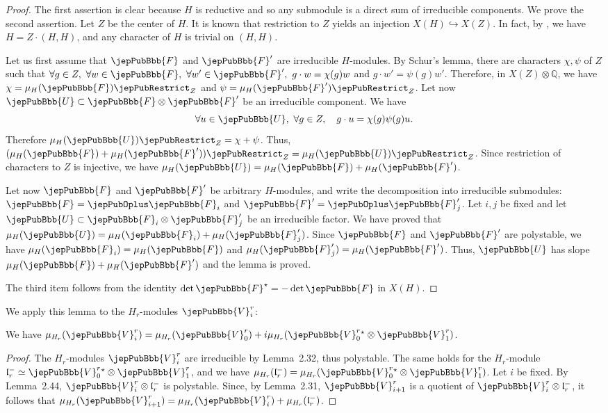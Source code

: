\begin{proof}
The first assertion is clear because $H$ is reductive and so any submodule is a direct sum of irreducible components. We prove the second assertion. Let $Z$ be the center of $H$. It is known that restriction to $Z$ yields an injection $X(H)\hookrightarrow X(Z)$. In fact, by \cite[Prop.~14.2]{jep93Bor69}, we have $H=Z\cdot(H,H)$, and any character of $H$ is trivial on $(H,H)$.

Let us first assume that $\jepPubBbb{F}$ and $\jepPubBbb{F}'$ are irreducible $H$-modules. By Schur's lemma, there are characters $\chi,\psi$ of $Z$ such that $\forall g\in Z,\ \forall w\in \jepPubBbb{F},\ \forall w'\in \jepPubBbb{F}',\ g\cdot w=\chi(g)w$ and $g\cdot w'=\psi(g)w'$. Therefore, in $X(Z)\otimes\mathbb Q$, we have $\chi=\mu_H(\jepPubBbb{F})\jepPubRestrict_Z$ and $\psi=\mu_H(\jepPubBbb{F}')\jepPubRestrict_Z$. Let now $\jepPubBbb{U}\subset \jepPubBbb{F}\otimes \jepPubBbb{F}'$ be an irreducible component. We have
\[
\forall u\in \jepPubBbb{U},\ \forall g\in Z,\quad g\cdot u=\chi(g)\psi(g)u.
\]
Therefore $\mu_H(\jepPubBbb{U})\jepPubRestrict_Z=\chi+\psi$. Thus, $(\mu_H(\jepPubBbb{F})+\mu_H(\jepPubBbb{F}'))\jepPubRestrict_Z=\mu_H(\jepPubBbb{U})\jepPubRestrict_Z$. Since restriction of characters to $Z$ is injective, we have $\mu_H(\jepPubBbb{U})=\mu_H(\jepPubBbb{F})+\mu_H(\jepPubBbb{F}')$.

Let now $\jepPubBbb{F}$ and $\jepPubBbb{F}'$ be arbitrary $H$-modules, and write the decomposition into irreducible submodules: $\jepPubBbb{F}=\jepPubOplus \jepPubBbb{F}_i$ and $\jepPubBbb{F}'=\jepPubOplus \jepPubBbb{F}'_j$. Let $i,j$ be fixed and let $\jepPubBbb{U}\subset \jepPubBbb{F}_i\otimes \jepPubBbb{F}'_j$ be an irreducible factor. We have proved that $\mu_H(\jepPubBbb{U})=\mu_H(\jepPubBbb{F}_i)+\mu_H(\jepPubBbb{F}'_j)$. Since $\jepPubBbb{F}$ and $\jepPubBbb{F}'$ are polystable, we have $\mu_H(\jepPubBbb{F}_i)=\mu_H(\jepPubBbb{F})$ and $\mu_H(\jepPubBbb{F}'_j)=\mu_H(\jepPubBbb{F}')$. Thus, $\jepPubBbb{U}$ has slope $\mu_H(\jepPubBbb{F})+\mu_H(\jepPubBbb{F}')$ and the lemma is proved.

The third item follows from the identity $\det \jepPubBbb{F}^\star=-\det \jepPubBbb{F}$ in $X(H)$.
\end{proof}
We apply this lemma to the $H_r$-modules $\jepPubBbb{V}^r_i$:
\begin{proposition}
We have $\mu_{H_r}(\jepPubBbb{V}^r_i)=\mu_{H_r}(\jepPubBbb{V}^r_0)+i\mu_{H_r}(\jepPubBbb{V}^r_0{}^\star\otimes\jepPubBbb{V}^r_1)$.
\end{proposition}
\begin{proof}
The $H_r$-modules $\jepPubBbb{V}^r_i$ are irreducible by Lemma~2.32, thus polystable. The same holds for the $H_r$-module $\mathfrak l_r^-\simeq\jepPubBbb{V}^r_0{}^\star\otimes\jepPubBbb{V}^r_1$, and we have $\mu_{H_r}(\mathfrak l_r^-)=\mu_{H_r}(\jepPubBbb{V}^r_0{}^\star\otimes\jepPubBbb{V}^r_1)$. Let $i$ be fixed. By Lemma~2.44, $\jepPubBbb{V}^r_i\otimes\mathfrak l_r^-$ is polystable. Since, by Lemma~2.31, $\jepPubBbb{V}^r_{i+1}$ is a quotient of $\jepPubBbb{V}^r_i\otimes\mathfrak l_r^-$, it follows that $\mu_{H_r}(\jepPubBbb{V}^r_{i+1})=\mu_{H_r}(\jepPubBbb{V}^r_i)+\mu_{H_r}(\mathfrak l_r^-)$.
\end{proof}
